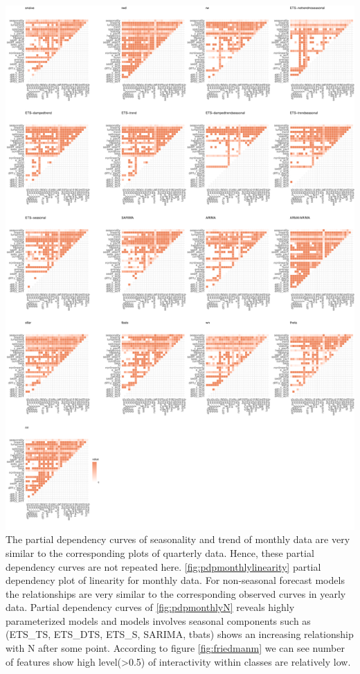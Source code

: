 \documentclass[11pt,a4paper,]{article}
\begin{document}
\includegraphics{figures/friedmanm-1.pdf}
The partial dependency curves of seasonality and trend of monthly data are very similar to the corresponding plots of quarterly data. Hence, these partial dependency curves are not repeated here. \autoref{fig:pdpmonthlylinearity} partial dependency plot of linearity for monthly data. For non-seasonal forecast models the relationships are very similar to the corresponding observed curves in yearly data. Partial dependency curves of \autoref{fig:pdpmonthlyN} reveals highly parameterized models and models involves seasonal components such as (ETS\_TS, ETS\_DTS, ETS\_S, SARIMA, tbats) shows an increasing relationship with N after some point. According to figure \autoref{fig:friedmanm} we can see number of features show high level(\textgreater{}0.5) of interactivity within classes are relatively low.
\end{document}
